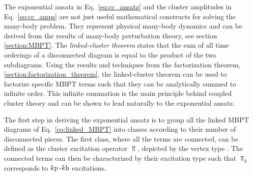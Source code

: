 \documentclass[thesis.tex]{subfiles}
\begin{document}
The exponential ansatz in Eq.\ \eqref{eq:cc_ansatz} and the cluster amplitudes in Eq.\ \eqref{eq:cc_amps} are not just useful mathematical constructs for solving the many-body problem. They represent physical many-body dynamics and can be derived from the results of many-body perturbation theory, see section \ref{section:MBPT}.  The \textit{linked-cluster theorem} \cite{HUGENHOLTZ1957481,FRANTZ196016,BRANDOW1967} states that the sum of all time orderings of a disconnected diagram is equal to the product of the two subdiagrams.  Using the results and techniques from the factorization theorem, \ref{section:factorization_theorem}, the linked-cluster theorem can be used to factorize specific MBPT terms such that they can be analytically summed to infinite order.  This infinite summation is the main principle behind coupled cluster theory and can be shown to lead naturally to the exponential ansatz.

The first step in deriving the exponential ansatz is to group all the linked MBPT diagrams of Eq.\ \eqref{eq:linked_MBPT} into classes according to their number of disconnected pieces.  The first class, where all the terms are connected, can be defined as the cluster excitation operator $\Top$, depicted by the vertex type .  The connected terms can then be characterized by their excitation type such that $\Top_{k}$ corresponds to $k\mathrm{p}\hspace{2pt}\text{-}k\mathrm{h}$ excitations.
\end{document}
